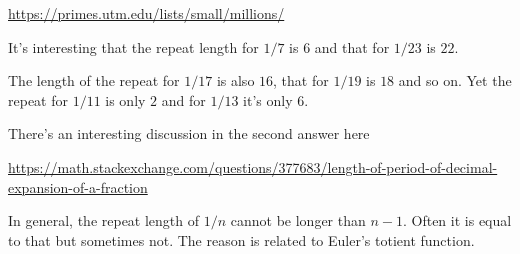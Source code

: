 \documentclass[11pt, oneside]{article}
\begin{document}
\url{https://primes.utm.edu/lists/small/millions/}

It's interesting that the repeat length for $1/7$ is $6$ and that for $1/23$ is $22$.  

The length of the repeat for $1/17$ is also $16$, that for $1/19$ is $18$ and so on.  Yet the repeat for $1/11$ is only $2$ and for $1/13$ it's only $6$.  

There's an interesting discussion in the second answer here

\url{https://math.stackexchange.com/questions/377683/length-of-period-of-decimal-expansion-of-a-fraction}

In general, the repeat length of $1/n$ cannot be longer than $n-1$.  Often it is equal to that but sometimes not.  The reason is related to Euler's totient function.

 
\end{document}
